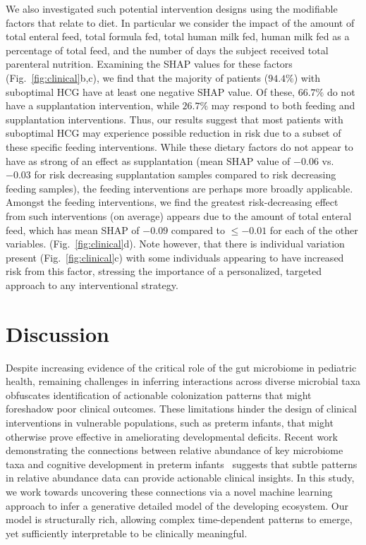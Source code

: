 \documentclass[onecolumn,10pt]{IEEEtran}
\begin{document}
We also investigated such potential intervention designs using the modifiable factors that relate to diet. In particular we consider the impact of the amount of total enteral feed, total formula fed, total human milk fed, human milk fed as a percentage of total feed, and the number of days the subject received total parenteral nutrition. Examining the SHAP values for these factors (Fig.~\ref{fig:clinical}b,c), we find that the majority of patients ($94.4\%$) with suboptimal HCG have at least one negative SHAP value. Of these, $66.7\%$ do not have a supplantation intervention, while $26.7\%$ may respond to both feeding and supplantation interventions. Thus, our results suggest that most patients with suboptimal HCG may experience possible reduction in risk due to a subset of these specific feeding interventions.  While these dietary factors do not appear to have as strong of an effect as supplantation (mean SHAP value of $-0.06$ vs. $-0.03$ for risk decreasing supplantation samples compared to risk decreasing feeding samples), the feeding interventions are perhaps more broadly applicable. Amongst the feeding interventions, we find the greatest risk-decreasing effect from such interventions (on average) appears due to the amount of total enteral feed, which has mean SHAP of $-0.09$ compared to $\leq -0.01$ for each of the other variables. (Fig.~\ref{fig:clinical}d). Note however, that there is individual variation present (Fig.~\ref{fig:clinical}c) with some individuals appearing to have increased risk from this factor,  stressing the importance of a personalized, targeted approach to any interventional strategy.

\section*{Discussion}
Despite increasing evidence of  the critical role of the gut microbiome in pediatric health,  remaining challenges  in inferring  interactions across diverse microbial taxa obfuscates  identification of actionable colonization patterns that might foreshadow poor clinical outcomes. These limitations hinder the  design of   clinical interventions  in vulnerable populations, such as preterm infants, that might otherwise prove effective in  ameliorating developmental deficits.  Recent work demonstrating the connections between relative abundance of key microbiome taxa and cognitive development in preterm infants~\cite{oliphant2021bacteroidota} suggests that subtle  patterns in relative abundance data can provide actionable  clinical insights.  In this study, we work towards uncovering these connections via  a novel  machine learning approach to infer a generative detailed model of the developing ecosystem. Our model is structurally rich, allowing complex time-dependent patterns to emerge, yet sufficiently interpretable to be  clinically meaningful.   
\end{document}
